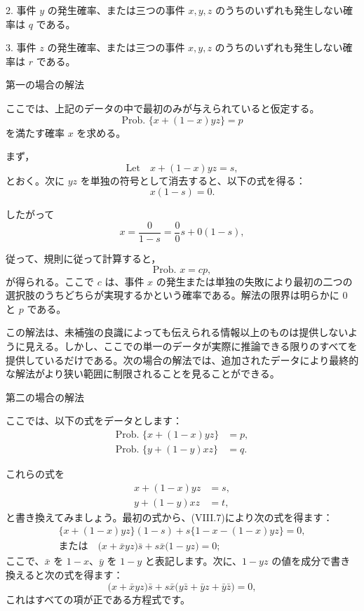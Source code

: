 \documentclass[a4paper,11pt,openany]{ltjsbook}
\begin{document}
2. 事件 \(y\) の発生確率、または三つの事件 \(x, y, z\) のうちのいずれも発生しない確率は \(q\) である。

3. 事件 \(z\) の発生確率、または三つの事件 \(x, y, z\) のうちのいずれも発生しない確率は \(r\) である。

第一の場合の解法

ここでは、上記のデータの中で最初のみが与えられていると仮定する。
\[
\textrm{Prob. }\{x + (1 - x)yz\} = p
\]
を満たす確率 \(x\) を求める。

まず，
\[
  \textrm{Let}\quad x + (1 - x)yz = s,
\]
とおく。次に \(yz\) を単独の符号として消去すると、以下の式を得る：
\begin{equation*}
x(1 - s) = 0.
\end{equation*}

したがって
\begin{equation*}
x = \frac{0}{1-s} = \frac{0}{0}s + 0(1-s),
\end{equation*}

従って、規則に従って計算すると，
\[
\textrm{Prob. } x = cp,
\]
が得られる。ここで \(c\) は、事件 \(x\) の発生または単独の失敗により最初の二つの選択肢のうちどちらが実現するかという確率である。解法の限界は明らかに \(0\) と \(p\) である。

この解法は、未補強の良識によっても伝えられる情報以上のものは提供しないように見える。しかし、ここでの単一のデータが実際に推論できる限りのすべてを提供しているだけである。次の場合の解法では、追加されたデータにより最終的な解法がより狭い範囲に制限されることを見ることができる。

第二の場合の解法

ここでは、以下の式をデータとします：
\begin{align*}
  \textrm{Prob. }\{ x + (1 - x)yz \} &= p, \\
  \textrm{Prob. }\{ y + (1 - y)xz \} &= q.
\end{align*}

これらの式を
\begin{align*}
  x + (1 - x)yz &= s, \\
  y + (1 - y)xz &= t,
\end{align*}
と書き換えてみましょう。最初の式から、(VIII.7)により次の式を得ます：
\begin{gather*}
  \{x + (1 - x)yz\} (1 - s)
+ s \{1 - x - (1 - x)yz\} = 0, \\
  \textrm{または}\quad
  \bigl( x + \bar{x}yz \bigr)\bar{s}
+ s\bar{x}\bigl( 1 - yz \bigr) = 0;
\end{gather*}
ここで、$\bar{x}$ を $1 - x$、$\bar{y}$ を $1 - y$ と表記します。次に、$1 - yz$ の値を成分で書き換えると次の式を得ます：
\begin{equation*}
\bigl( x + \bar{x}yz \bigr)\bar{s}
+ s\bar{x}\bigl( y\bar{z} + \bar{y}z + \bar{y}\bar{z} \bigr) = 0,
\end{equation*}
これはすべての項が正である方程式です。
\end{document}
